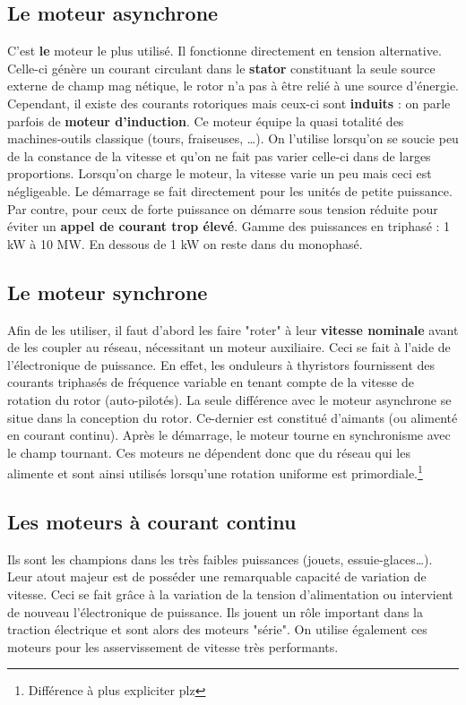 	\subsection{Le moteur asynchrone}
	C'est \textbf{le} moteur le plus utilisé. Il fonctionne directement 
	en tension alternative. Celle-ci génère un courant circulant dans le 
	\textbf{stator} constituant la seule source externe de champ mag
	nétique, le 
	rotor n'a pas à être relié à une source d'énergie. Cependant, il existe 
	des courants rotoriques mais ceux-ci sont \textbf{induits} : on parle 
	parfois de \textbf{moteur d'induction}. Ce moteur équipe la quasi 
	totalité des machines-outils classique (tours, fraiseuses, \dots).
	On l'utilise lorsqu'on se soucie peu de la constance de la vitesse et qu'on ne fait
	 pas varier celle-ci dans de larges proportions. Lorsqu'on charge le moteur, la
	 vitesse varie un peu mais ceci est négligeable. Le démarrage se fait
	 directement	  
	 pour les unités de petite puissance. Par contre, pour ceux de forte puissance on
	 démarre sous tension réduite pour éviter un \textbf{appel de courant trop
	 élevé}.
	 Gamme des puissances en triphasé : 1 kW à 10 MW. En dessous de 1 kW on
	 reste dans du monophasé. 
	 
	
	\subsection{Le moteur synchrone}
	Afin de les utiliser, il faut d'abord les faire "roter" à leur 
	\textbf{vitesse nominale} avant de les coupler au réseau, nécessitant un 
	moteur auxiliaire. Ceci se fait à l'aide de l'électronique de puissance. En effet, les
	onduleurs à thyristors fournissent des courants triphasés de fréquence variable
	en tenant compte de la vitesse de rotation du rotor (auto-pilotés). La seule
	différence avec le moteur asynchrone 
	se situe dans la conception du rotor. Ce-dernier est constitué 
	d'aimants (ou alimenté en courant continu). Après le démarrage, le 
	moteur tourne en synchronisme avec le champ tournant. Ces moteurs 
	ne dépendent donc que du réseau qui les alimente et sont ainsi 
	utilisés lorsqu'une rotation uniforme est primordiale.\footnote{
	Différence à plus expliciter plz}
	
	
	\subsection{Les moteurs à courant continu}
	Ils sont les champions dans les très faibles puissances (jouets, 
	essuie-glaces\dots). Leur atout majeur est de posséder une 
	remarquable capacité de variation de vitesse. Ceci se fait grâce à la variation de
	la tension d'alimentation ou intervient de nouveau l'électronique de puissance. Ils
	jouent un rôle 
	important dans la traction électrique et sont alors des
	moteurs "série". On utilise également ces moteurs pour les asservissement de vitesse très performants. 
	
